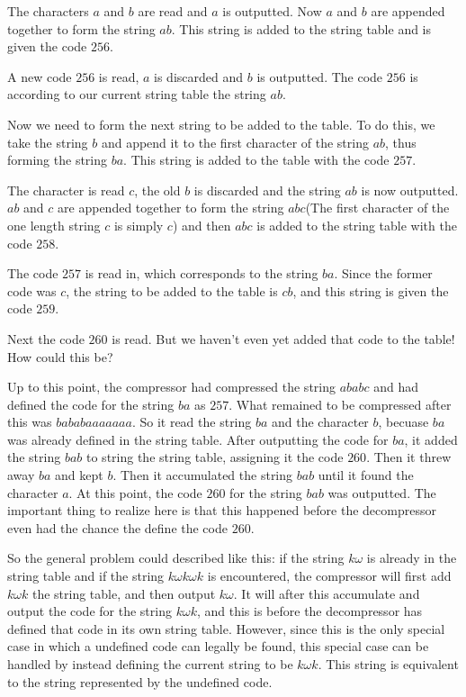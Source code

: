 The characters $a$ and $b$ are read and $a$ is outputted. Now $a$ and
$b$ are appended together to form the string $ab$. This string is
added to the string table and is given the code $256$.

A new code $256$ is read, $a$ is discarded and $b$ is outputted. The
code $256$ is according to our current string table the string
$ab$.

Now we need to form the next string to be added to the table. To do
this, we take the string $b$ and append it to the first character of
the string $ab$, thus forming the string $ba$. This string is added to
the table with the code $257$.

The character is read $c$, the old $b$ is discarded and the string
$ab$ is now outputted. $ab$ and $c$ are appended together to form the
string $abc$(The first character of the one length string $c$ is
simply $c$) and then $abc$ is added to the string table with
the code $258$.

The code $257$ is read in, which corresponds to the string $ba$. Since
the former code was $c$, the string to be added to the table is $cb$,
and this string is given the code $259$.

Next the code $260$ is read. But we haven't even yet added that code
to the table! How could this be?

Up to this point, the compressor had compressed the string $ababc$ and
had defined the code for the string $ba$ as $257$. What remained to be
compressed after this was $bababaaaaaaa$. So it read the string $ba$
and the character $b$, becuase $ba$ was already defined in the string
table. After outputting the code for $ba$, it added the string $bab$
to string the string table, assigning it the code $260$. Then it threw
away $ba$ and kept $b$. Then it accumulated the string $bab$ until it
found the character $a$. At this point, the code $260$ for the string
$bab$ was outputted.  The important thing to realize here is that this
happened before the decompressor even had the chance the define the
code $260$.

\newcommand{\ko}{\ensuremath{k\omega}\xspace}
\newcommand{\kok}{\ensuremath{\ko k}\xspace}
\newcommand{\kokok}{\ensuremath{\kok \omega k}\xspace}

So the general problem could described like this\cite{welch85:_u}: if
the string \ko is already in the string table and if the string \kokok
is encountered, the compressor will first add \kok the string table,
and then output \ko. It will after this accumulate and output the code
for the string \kok, and this is before the decompressor has defined
that code in its own string table. However, since this is the only
special case in which a undefined code can legally be found, this
special case can be handled by instead defining the current string to
be $\kok$. This string is equivalent to the string represented by the
undefined code.

